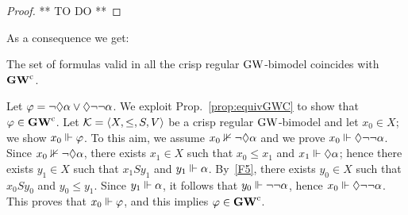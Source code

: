 \begin{proof}
  ** TO DO **
\end{proof}


As a consequence we get:

\begin{proposition}\label{prop:equivGWC}
  The set of formulas valid in all the crisp  regular $\mbox{$\mathrm{GW}$}$-bimodel coincides with $\mathbf{GW}^\mathrm{c}$.
\end{proposition}

\begin{example}\label{ex:axiomGWC1}
Let $\varphi=\neg \lozenge \alpha\lor \lozenge\neg\neg \alpha$.   We exploit Prop.~\ref{prop:equivGWC} to show that $\varphi\in\mathbf{GW}^\mathrm{c}$.
Let $\mathcal{K}=\langle X,\leq,S,V \rangle$ be a  crisp regular  $\mbox{$\mathrm{GW}$}$-bimodel and let $x_0\in X$;
we show $x_0\Vdash \varphi$.
To this aim, we assume  $x_0\nVdash\neg \lozenge \alpha$ and we prove   $x_0\Vdash\lozenge\neg\neg \alpha$.
Since   $x_0\nVdash\neg \lozenge \alpha$, there exists $x_1\in X$ such that $x_0\leq x_1$ and $x_1\Vdash  \lozenge \alpha$;
hence  there exists $y_1\in X$ such that $x_1 S y_1$ and $y_1\Vdash \alpha$.
By~\ref{F5}, there exists $y_0\in X$ such that  $x_0 S y_0$ and $y_0 \leq y_1$.
Since $y_1\Vdash \alpha$, 
it follows that  $y_0\Vdash\neg\neg \alpha$,  hence  $x_0\Vdash\lozenge\neg\neg \alpha$.
This proves that    $x_0\Vdash \varphi$, and this implies
 $\varphi\in\mathbf{GW}^\mathrm{c}$.
\EndEx  
  \end{example}

